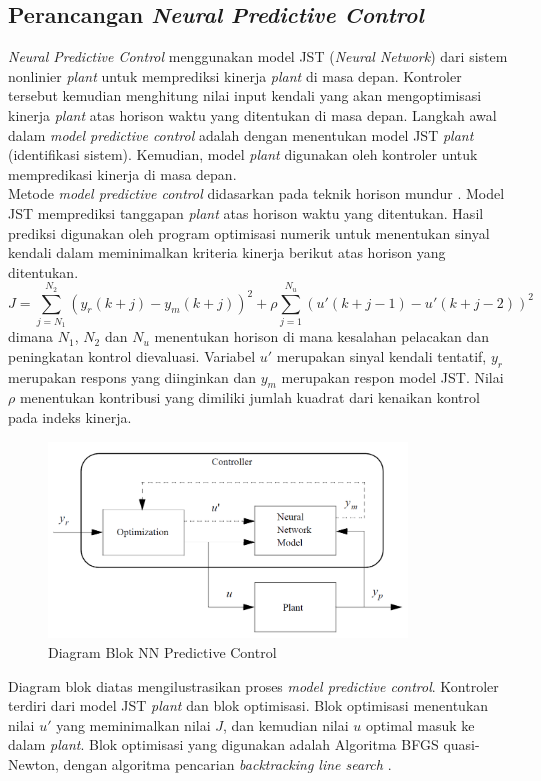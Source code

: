 \subsection{Perancangan \textit{Neural Predictive Control}}

\textit{Neural Predictive Control} menggunakan model JST (\textit{Neural Network}) dari sistem nonlinier \textit{plant} untuk memprediksi kinerja \textit{plant} di masa depan. Kontroler tersebut kemudian menghitung nilai input kendali yang akan mengoptimisasi kinerja \textit{plant} atas horison waktu yang ditentukan di masa depan. Langkah awal dalam \textit{model predictive control} adalah dengan menentukan model JST \textit{plant} (identifikasi sistem). Kemudian, model \textit{plant} digunakan oleh kontroler untuk mempredikasi kinerja di masa depan.\\

Metode \textit{model predictive control} didasarkan pada teknik horison mundur \cite{article23}. Model JST memprediksi tanggapan \textit{plant} atas horison waktu yang ditentukan. Hasil prediksi digunakan oleh program optimisasi numerik untuk menentukan sinyal kendali dalam meminimalkan kriteria kinerja berikut atas horison yang ditentukan.
\begin{equation} \label{eq:3:performance}
J = \sum_{j=N_1}^{N_2} (y_r(k+j) - y_m(k+j))^2 + \rho\sum_{j=1}^{N_u} (u'(k+j-1) - u'(k+j-2))^2
\end{equation}
dimana $N_1$, $N_2$ dan $N_u$ menentukan horison di mana kesalahan pelacakan dan peningkatan kontrol dievaluasi. Variabel $u'$ merupakan sinyal kendali tentatif, $y_r$ merupakan respons yang diinginkan dan $y_m$ merupakan respon model JST. Nilai $\rho$ menentukan kontribusi yang dimiliki jumlah kuadrat dari kenaikan kontrol pada indeks kinerja.
\begin{figure}[!h]
	\centering
	\includegraphics[width=0.85\textwidth]{figures/NNPredictiveControl}
	\caption{Diagram Blok NN Predictive Control}
	\label{fig:3:nncontrolblock}
\end{figure}

Diagram blok diatas mengilustrasikan proses \textit{model predictive control}. Kontroler terdiri dari model JST \textit{plant} dan blok optimisasi. Blok optimisasi menentukan nilai $u'$ yang meminimalkan nilai $J$, dan kemudian nilai $u$ optimal masuk ke dalam \textit{plant}. Blok optimisasi yang digunakan adalah Algoritma BFGS quasi-Newton, dengan algoritma pencarian \textit{backtracking line search} \cite{article24}.